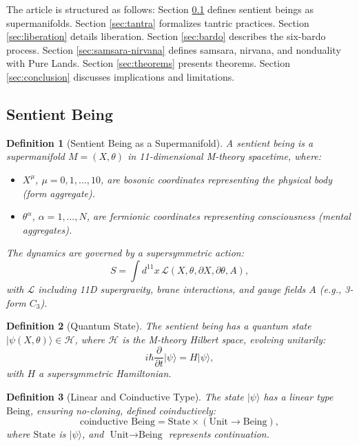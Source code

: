\documentclass{article}
\newtheorem{definition}{Definition}
\begin{document}
The article is structured as follows: Section \ref{sec:being} defines sentient beings as supermanifolds. Section \ref{sec:tantra} formalizes tantric practices. Section \ref{sec:liberation} details liberation. Section \ref{sec:bardo} describes the six-bardo process. Section \ref{sec:samsara-nirvana} defines samsara, nirvana, and nonduality with Pure Lands. Section \ref{sec:theorems} presents theorems. Section \ref{sec:conclusion} discusses implications and limitations.

\subsection{Sentient Being}
\label{sec:being}

\begin{definition}[Sentient Being as a Supermanifold]
\label{def:supermanifold}
A sentient being is a supermanifold \( M = (X, \theta) \) in 11-dimensional M-theory spacetime, where:
\begin{itemize}
    \item \( X^\mu \), \(\mu = 0, 1, \ldots, 10\), are bosonic coordinates representing the physical body (form aggregate).
    \item \( \theta^\alpha \), \(\alpha = 1, \ldots, N\), are fermionic coordinates representing consciousness (mental aggregates).
\end{itemize}
The dynamics are governed by a supersymmetric action:
\[
S = \int d^{11}x \, \mathcal{L}(X, \theta, \partial X, \partial \theta, A),
\]
with \( \mathcal{L} \) including 11D supergravity, brane interactions, and gauge fields \( A \) (e.g., 3-form \( C_3 \)).
\end{definition}

\begin{definition}[Quantum State]
\label{def:quantum-state}
The sentient being has a quantum state \( |\psi(X, \theta)\rangle \in \mathcal{H} \), where \( \mathcal{H} \) is the M-theory Hilbert space, evolving unitarily:
\[
i \hbar \frac{\partial}{\partial t} |\psi\rangle = H |\psi\rangle,
\]
with \( H \) a supersymmetric Hamiltonian.
\end{definition}

\begin{definition}[Linear and Coinductive Type]
\label{def:type}
The state \( |\psi\rangle \) has a linear type \( \text{Being} \), ensuring no-cloning, defined coinductively:
\[
\text{coinductive } \text{Being} = \text{State} \times (\text{Unit} \to \text{Being}),
\]
where \( \text{State} \) is \( |\psi\rangle \), and \( \text{Unit} \to \text{Being} \) represents continuation.
\end{definition}
\end{document}
